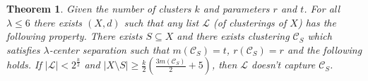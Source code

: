 \documentclass[12pt]{article}
\newtheorem{theorem}{Theorem}
\newcommand{\mc}{\mathcal}
\begin{document}
\begin{theorem}
\label{thm:nosparselistlambdacs}
Given the number of clusters $k$ and parameters $r$ and $t$. For all $\lambda \le 6$ there exists $(X, d)$ such that any list $\mc L$ (of clusterings of $X$) has the following property. There exists $S \subseteq X$ and there exists clustering $\mc C_{S}$ which satisfies $\lambda$-center separation such that $m(\mc C_{S}) = t$, $r(\mc C_{S}) = r$ and the following holds. If $|\mc L| < 2^{\frac{k}{2}}$ and $|X \setminus S|\ge \frac{k}{2}(\frac{3m(\mc C_{S})}{2}+5)$, then $\mc L$ doesn't capture $\mc C_{S}$.
\end{theorem}

\ifdefined\COMPLETE
\else
\end{document}

